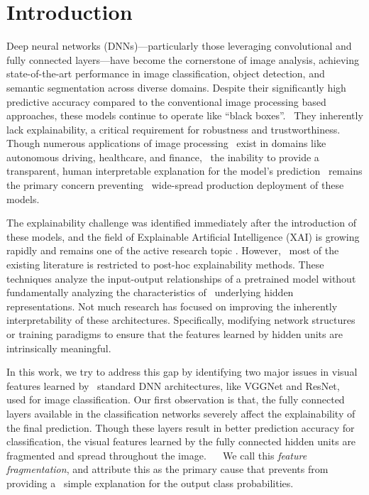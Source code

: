 \documentclass[pdflatex,referee,lineno]{sn-jnl}
\theoremstyle{thmstyleone}
\theoremstyle{thmstyletwo}
\theoremstyle{thmstylethree}
\begin{document}
\maketitle

\section{Introduction}\label{sec:intro}

Deep neural networks (DNNs)—particularly those leveraging convolutional and fully connected layers—have become the cornerstone of image analysis, achieving state-of-the-art performance in image classification, object detection, and semantic segmentation across diverse domains. Despite their significantly high predictive accuracy compared to the conventional image processing based approaches, these models continue to operate like ``black boxes''.  They inherently lack explainability, a critical  requirement  for  robustness and trustworthiness. Though numerous applications of image processing  exist in domains like autonomous driving, healthcare, and finance,  the inability to provide a transparent, human interpretable explanation for the model's prediction  remains  the primary concern  preventing  wide-spread production deployment of these models.

The explainability challenge was identified immediately after the introduction of these models, and the field of Explainable Artificial Intelligence (XAI) is growing rapidly and remains one of the active research topic  \cite{simonyan2013deep}\cite{zhou2016cam}\cite{lundberg2017unified}\cite{ribeiro2016should}. However,  most of the existing literature is restricted to post-hoc explainability methods. These techniques analyze the input-output relationships of a pretrained model  without fundamentally analyzing the characteristics of  underlying hidden representations. Not much research has focused on improving the inherently interpretability of these architectures. Specifically, modifying network structures or training paradigms to ensure that the features learned by hidden units are intrinsically meaningful.

In this work, we try to address this gap by identifying two major issues in visual features learned by  standard DNN architectures, like VGGNet and ResNet,  used for image classification. Our first observation is that, the fully connected layers available in the classification networks severely affect the explainability of the final prediction. Though these layers result in better prediction accuracy for classification, the visual features learned by the fully connected hidden units are fragmented and spread throughout the image.    We call this \textit{feature fragmentation}, and attribute this as the primary cause that prevents  from providing a  simple explanation for the output class probabilities. 
\end{document}
